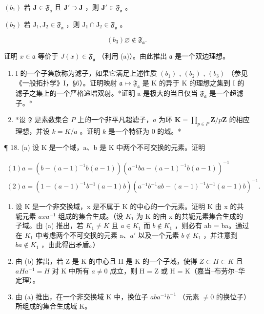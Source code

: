 \((b_{1})\) 若 \(\mathbf{J} \in \mathfrak{F}_{\mathfrak{a}}\) 且 \(\mathbf{J}' \supset \mathbf{J}\) ，则 \(\mathbf{J}' \in \mathfrak{F}_{\mathfrak{a}}\) 。

\((b_{2})\) 若 \(\mathrm{J}_1, \mathrm{J}_2 \in \mathfrak{F}_{\mathfrak{a}}\) ，则 \(\mathrm{J}_1 \cap \mathrm{J}_2 \in \mathfrak{F}_{\mathfrak{a}}\) 。

\[
\left(b _ {3}\right) \varnothing \notin \mathfrak {F} _ {\mathfrak {a}}.
\]

证明 \(x \in \mathfrak{a}\) 等价于 \(J(x) \in \mathfrak{F}_{\mathfrak{a}}\) （利用 (a)）。由此推出 \(\mathfrak{a}\) 是一个双边理想。

\begin{enumerate}
\def\labelenumi{(\alph{enumi})}
\setcounter{enumi}{2}
\item
  I 的一个子集族称为滤子，如果它满足上述性质 \((b_{1})\) , \((b_{2})\) , \((b_{3})\) （参见《一般拓扑学》I，§6）。证明映射 \(\mathfrak{a} \mapsto \mathfrak{F}_{\mathfrak{a}}\) 是 K 的异于 K 的理想之集到 I 的滤子之集上的一个严格递增双射。*证明 a 是极大的当且仅当 \(\mathfrak{F}_{\mathfrak{a}}\) 是一个超滤子。*
\item
  *设 \(\mathfrak{F}\) 是素数集合 \(P\) 上的一个非平凡超滤子，\(a\) 为环 \(\mathbf{K} = \prod_{p \in P} \mathbf{Z}/p\mathbf{Z}\) 的相应理想，并设 \(k = K/a\) 。证明 \(k\) 是一个特征为 \(0\) 的域。*
\end{enumerate}

¶ 18. (a) 设 K 是一个域，a、b 是 K 中两个不可交换的元素。证明

\[
\begin{array}{l} (1) a = (b - (a - 1) ^ {- 1} b (a - 1)) (a ^ {- 1} b a - (a - 1) ^ {- 1} b (a - 1)) ^ {- 1} \\ (2) a = (1 - (a - 1) ^ {- 1} b ^ {- 1} (a - 1) b) (a ^ {- 1} b ^ {- 1} a b - (a - 1) ^ {- 1} b ^ {- 1} (a - 1) b) ^ {- 1}. \end{array}
\]

\begin{enumerate}
\def\labelenumi{(\alph{enumi})}
\setcounter{enumi}{1}
\item
  设 K 是一个非交换域，x 是不属于 K 的中心的一个元素。证明 K 由 x 的共轭元素 \(axa^{-1}\) 组成的集合生成。（设 \(K_{1}\) 为 K 的由 x 的共轭元素集合生成的子域。由 (a) 推出，若 \(K_{1} \neq K\) 且 \(a \in K_{1}\) 而 \(b \notin K_{1}\) ，则必有 ab = ba。通过在 \(K_{1}\) 中考虑两个不可交换的元素 a、\(a'\) 以及一个元素 \(b \notin K_{1}\) ，并注意到 \(ba \notin K_{1}\) ，由此得出矛盾。）
\item
  由 (b) 推出，若 Z 是 K 的中心且 H 是 K 的一个子域，使得 \(Z \subset H \subset K\) 且 \(aHa^{-1} = H\) 对 K 中所有 \(a \neq 0\) 成立，则 H = Z 或 H = K（嘉当–布劳尔–华定理）。
\item
  由 (a) 推出，在一个非交换域 K 中，换位子 \(aba^{-1}b^{-1}\) （元素 \(\neq0\) 的换位子）所组成的集合生成域 K。
\end{enumerate}

